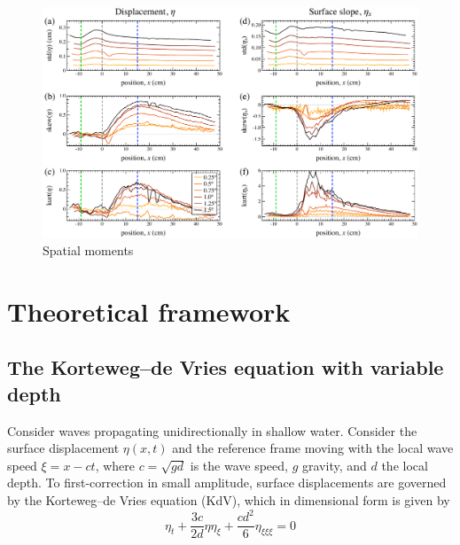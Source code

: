 \documentclass[11pt]{article}
\newcommand{\depth}{d}
\begin{document}
\begin{figure}%
\begin{center}
\includegraphics[width = 0.9 \linewidth]{Figs/ExpSpatialStats.pdf}
\caption{Spatial moments}
\label{ExpSpatialStats}
\end{center}
\end{figure}

 
\section{Theoretical framework}

\subsection{The Korteweg–de Vries equation with variable depth}
Consider waves propagating unidirectionally in shallow water. Consider the surface displacement $\eta(x,t)$ and the reference frame moving with the local wave speed $\xi = x - ct$, where $c = \sqrt{g \depth}$ is the wave speed, $g$ gravity, and $\depth$ the local depth.
To first-correction in small amplitude, surface displacements are governed by the Korteweg–de Vries equation (KdV), which in dimensional form is given by \cite{whitham2011linear}
\begin{equation}
\label{KdV}
\eta_t + \frac{3 c}{2 \depth} \eta \eta_{\xi} + \frac{c \depth^2}{6} \eta_{\xi \xi \xi} = 0
\end{equation}
\end{document}

